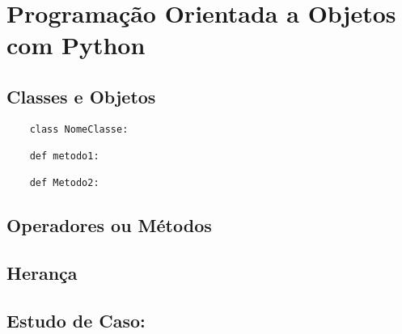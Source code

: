 

\chapter{ Programa\c{c}\~{a}o Orientada a Objetos com Python}

    \section{Classes e Objetos}


   \begin{lstlisting}
    class NomeClasse:

    def metodo1:

    def Metodo2:

    \end{lstlisting}

    \section{Operadores ou M\'{e}todos}


    \section{Heran\c{c}a}


    \section{Estudo de Caso: }
